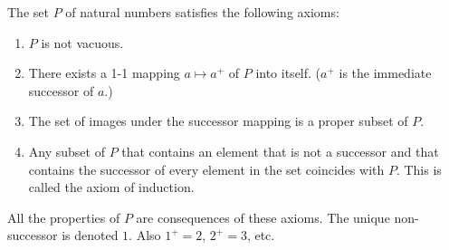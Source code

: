 The set $P$ of natural numbers satisfies the following axioms:
\begin{enumerate}
\item $P$ is not vacuous.
\item There exists a 1-1 mapping $a \mapsto a^+$ of $P$ into itself. ($a^+$ is the immediate successor of $a$.)
\item The set of images under the successor mapping is a proper subset of $P$.
\item Any subset of $P$ that contains an element that is not a successor and that contains the successor of every element in the set coincides with $P$. This is called the axiom of induction.
\end{enumerate}
All the properties of $P$ are consequences of these axioms. The unique non-successor is denoted $1$. Also $1^+ = 2$, $2^+ = 3$, etc.
